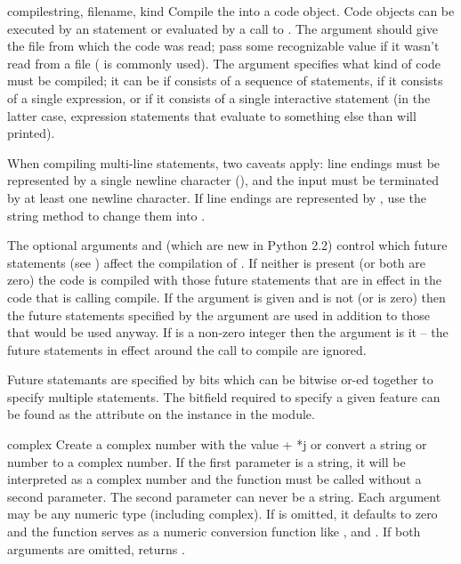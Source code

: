 \begin{funcdesc}{compile}{string, filename, kind}
  Compile the  into a code object.  Code objects can be
  executed by an  statement or evaluated by a call to
  .  The  argument should
  give the file from which the code was read; pass some recognizable value
  if it wasn't read from a file ( is commonly used).
  The  argument specifies what kind of code must be
  compiled; it can be  if  consists of a
  sequence of statements,  if it consists of a single
  expression, or  if it consists of a single
  interactive statement (in the latter case, expression statements
  that evaluate to something else than  will printed).

  When compiling multi-line statements, two caveats apply: line
  endings must be represented by a single newline character
  (), and the input must be terminated by at least one
  newline character.  If line endings are represented by
  , use the string  method to
  change them into .

  The optional arguments  and 
  (which are new in Python 2.2) control which future statements (see
  ) affect the compilation of .  If neither is
  present (or both are zero) the code is compiled with those future
  statements that are in effect in the code that is calling compile.
  If the  argument is given and  is not
  (or is zero) then the future statements specified by the 
  argument are used in addition to those that would be used anyway.
  If  is a non-zero integer then the 
  argument is it -- the future statements in effect around the call to
  compile are ignored.

  Future statemants are specified by bits which can be bitwise or-ed
  together to specify multiple statements.  The bitfield required to
  specify a given feature can be found as the 
  attribute on the  instance in the
   module.
\end{funcdesc}

\begin{funcdesc}{complex}{}
  Create a complex number with the value  + *j or
  convert a string or number to a complex number.  If the first
  parameter is a string, it will be interpreted as a complex number
  and the function must be called without a second parameter.  The
  second parameter can never be a string.
  Each argument may be any numeric type (including complex).
  If  is omitted, it defaults to zero and the function
  serves as a numeric conversion function like ,
   and .  If both arguments
  are omitted, returns .
\end{funcdesc}

